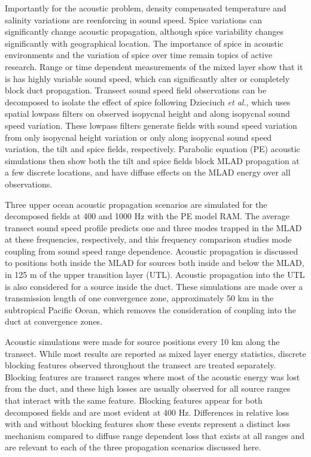 \documentclass[preprint,NumberedRefs]{JASA}
\begin{document}
Importantly for the acoustic problem, density compensated temperature and salinity variations are reenforcing in sound speed. Spice variations can significantly change acoustic propagation, although spice variability changes significantly with geographical location\citep{colosi12,colosi13,murat2021}. The importance of spice in acoustic environments and the variation of spice over time remain topics of active research. Range or time dependent measurements of the mixed layer show that it is has highly variable sound speed\citep{cole2010seasonal,rudnick1999compensation,klymak2015}, which can significantly alter or completely block duct propagation\citep{colosi2020observations,colosi21}. Transect sound speed field observations can be decomposed to isolate the effect of spice following Dzieciuch \emph{et al.}\citep{dzieciuch2004}, which uses spatial lowpass filters on observed isopycnal height and along isopycnal sound speed variation. These lowpass filters generate fields with sound speed variation from only isopycnal height variation or only along isopycnal sound speed variation, the tilt and spice fields, respectively. Parabolic equation (PE) acoustic simulations\citep{collins93} then show both the tilt and spice fields block MLAD propagation at a few discrete locations, and have diffuse effects on the MLAD energy over all observations.

Three upper ocean acoustic propagation scenarios are simulated for the decomposed fields at 400 and 1000 Hz with the PE model RAM\cite{collins93}. The average transect sound speed profile predicts one and three modes trapped in the MLAD at these frequencies, respectively, and this frequency comparison studies mode coupling from sound speed range dependence. Acoustic propagation is discussed to positions both inside the MLAD for sources both inside and below the MLAD, in 125 m of the upper transition layer (UTL). Acoustic propagation into the UTL is also considered for a source inside the duct. These simulations are made over a transmission length of one convergence zone\citep{jensen2011computational}, approximately 50 km in the subtropical Pacific Ocean, which removes the consideration of coupling into the duct at convergence zones\citep{colosi2020observations}.

Acoustic simulations were made for source positions every 10 km along the transect. While most results are reported as mixed layer energy statistics, discrete blocking features\citep{colosi2020observations} observed throughout the transect are treated separately. Blocking features are transect ranges where most of the acoustic energy was lost from the duct, and these high losses are usually observed for all source ranges that interact with the same feature. Blocking features appear for both decomposed fields and are most evident at 400 Hz. Differences in relative loss with and without blocking features show these events represent a distinct loss mechanism compared to diffuse range dependent loss that exists at all ranges and are relevant to each of the three propagation scenarios discussed here.
\end{document}
